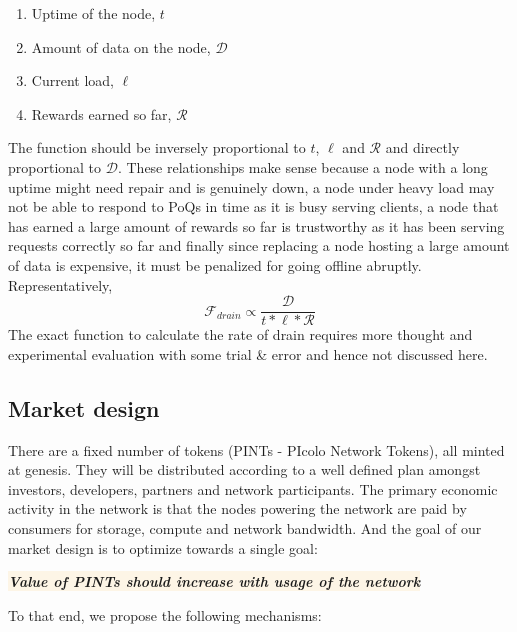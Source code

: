  \begin{enumerate}
	\item Uptime of the node, $t$
	\item Amount of data on the node, $\mathcal{D}$
	\item Current load, $\ell$
	\item Rewards earned so far, $\mathcal{R}$
\end{enumerate}
The function should be inversely proportional to $t$, $\ell$ and $\mathcal{R}$ and directly proportional to $\mathcal{D}$. These relationships make sense because a node with a long uptime might need repair and is genuinely down, a node under heavy load may not be able to respond to PoQs in time as it is busy serving clients, a node that has earned a large amount of rewards so far is trustworthy as it has been serving requests correctly so far and finally since replacing a node hosting a  large amount of data is expensive, it must be penalized for going offline abruptly. Representatively,
\newline
$$ \mathcal{F}_{drain} \propto \frac{\mathcal{D}} {t * \ell * \mathcal{R}}$$
\newline
The exact function to calculate the rate of drain requires more thought and experimental evaluation with some trial \& error and hence not discussed here.

\subsection{Market design}
There are a fixed number of tokens (PINTs - PIcolo Network Tokens), all minted at genesis. They will be distributed according to a well defined plan amongst investors, developers, partners and network participants. The primary economic activity in the network is that the nodes powering the network are paid by consumers for storage, compute and network bandwidth. And the goal of our market design is to optimize towards a single goal:
\begin{center}
	\colorbox{oldlace}{\textit{\large{\textbf{Value of PINTs should increase with usage of the network}}}}
\end{center}
To that end, we propose the following mechanisms:
